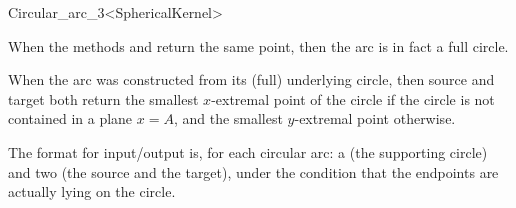 \begin{ccRefClass}{Circular_arc_3<SphericalKernel>}
\ccGlue
{}

When the methods  and  return the same point, then 
the arc is in fact a full circle. %

When the arc was constructed from its (full) underlying circle, then
source and target both return the smallest $x$-extremal point of the
circle if the circle is not contained in a plane $x=A$, and the smallest
$y$-extremal point otherwise.


\ccGlue
{}

The format for input/output is, for each circular arc: a  
(the supporting circle) and two  
(the source and the target), under the condition that the endpoints 
are actually lying on the circle. 

\ccSeeAlso

\\

\end{ccRefClass}
